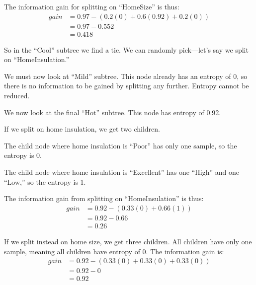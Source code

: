 \documentclass[11pt]{article}
\begin{document}
\begin{enumerate}
\begin{enumerate}
                The information gain for splitting on ``HomeSize'' is thus:
                \begin{align*}
                    gain &= 0.97 - \left(0.2(0) + 0.6(0.92) + 0.2(0)\right) \\
                    &= 0.97 - 0.552 \\
                    &= 0.418
                \end{align*}

                So in the ``Cool'' subtree we find a tie. We can randomly
                pick---let's say we split on ``HomeInsulation.''

                We must now look at ``Mild'' subtree. This node already has an
                entropy of 0, so there is no information to be gained by
                splitting any further. Entropy cannot be reduced.

                We now look at the final ``Hot'' subtree. This node has entropy
                of 0.92.

                If we split on home insulation, we get two children.

                The child node where home insulation is ``Poor'' has only one
                sample, so the entropy is 0.

                The child node where home insulation is ``Excellent'' has one
                ``High'' and one ``Low,'' so the entropy is 1.

                The information gain from splitting on ``HomeInsulation'' is
                thus:
                \begin{align*}
                    gain &= 0.92 - \left(0.33(0) + 0.66(1)\right) \\
                    &= 0.92 - 0.66 \\
                    &= 0.26
                \end{align*}

                If we split instead on home size, we get three children. All
                children have only one sample, meaning all children have
                entropy of 0. The information gain is:
                \begin{align*}
                    gain &= 0.92 - \left(0.33(0) + 0.33(0) + 0.33(0)\right) \\
                    &= 0.92 - 0 \\
                    &= 0.92
                \end{align*}


\end{enumerate}
\end{enumerate}
\end{document}
